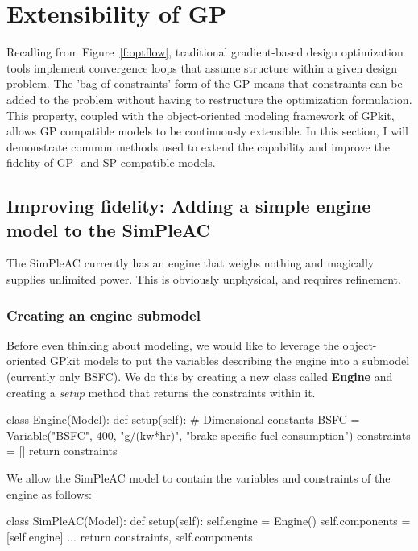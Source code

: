 \chapter{Extensibility of GP}
\label{ch3:extensibility}

Recalling from Figure~\ref{f:optflow}, traditional gradient-based design optimization tools implement
convergence loops that assume structure within a given design problem.
The 'bag of constraints' form of the GP means that constraints can be
added to the problem without
having to restructure the optimization formulation. This property,
coupled with the object-oriented modeling framework of GPkit, allows
\gls{GP} compatible models to be continuously extensible.
In this section, I will demonstrate common methods used to extend the capability
and improve the fidelity of \gls{GP}- and \gls{SP} compatible models.

\section{Improving fidelity: Adding a simple engine model to the SimPleAC}
\label{s:engine}

The SimPleAC currently has an engine that weighs nothing and magically supplies
unlimited power. This is obviously unphysical, and requires refinement.

\subsection{Creating an engine submodel}

Before even thinking about modeling, we would like to leverage the object-oriented
GPkit models to put the variables describing the engine into a submodel (currently only
BSFC). We do this by creating a new class called \textbf{Engine} and creating a \textit{setup}
method that returns the constraints within it.

\begin{python}
    class Engine(Model):
        def setup(self):
            # Dimensional constants
            BSFC = Variable("BSFC", 400, "g/(kw*hr)", "brake specific fuel consumption")
            constraints = []
            return constraints
\end{python}

We allow the SimPleAC model to contain the variables and constraints of the engine
as follows:

\begin{python}
    class SimPleAC(Model):
        def setup(self):
            self.engine = Engine()
            self.components = [self.engine]
            ...
            return constraints, self.components
\end{python}


